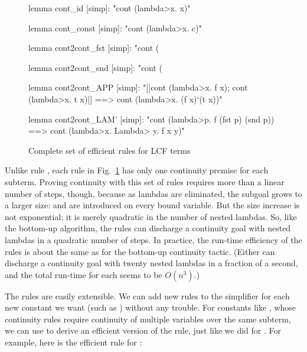 \begin{figure}
\begin{isacode}
lemma cont_id [simp]: "cont (\<lambda>x. x)"
\end{isacode}
\unmedskip
\begin{isacode}
lemma cont_const [simp]: "cont (\<lambda>x. c)"
\end{isacode}
\unmedskip
\begin{isacode}
lemma cont2cont_fst [simp]: "cont (%
\end{isacode}
\unmedskip
\begin{isacode}
lemma cont2cont_snd [simp]: "cont (%
\end{isacode}
\unmedskip
\begin{isacode}
lemma cont2cont_APP [simp]:
  "[|cont (\<lambda>x. f x); cont (\<lambda>x. t x)|] ==> cont (\<lambda>x. (f x)`(t x))"
\end{isacode}
\unmedskip
\begin{isacode}
lemma cont2cont_LAM' [simp]:
  "cont (\<lambda>p. f (fst p) (snd p)) ==> cont (\<lambda>x. \<Lambda> y. f x y)"
\end{isacode}
\caption{Complete set of efficient  rules for LCF terms}
\label{fig:holcf-cont2cont-rules}
\end{figure}

Unlike rule , each rule in Fig.~\ref{fig:holcf-cont2cont-rules} has only one continuity premise for each subterm. Proving continuity with this set of rules requires more than a linear number of steps, though, because as lambdas are eliminated, the subgoal grows to a larger size:  and  are introduced on every bound variable. But the size increase is not exponential; it is merely quadratic in the number of nested lambdas. So, like the bottom-up algorithm, the  rules can discharge a continuity goal with nested lambdas in a quadratic number of steps. In practice, the run-time efficiency of the  rules is about the same as for the bottom-up continuity tactic. (Either can discharge a continuity goal with twenty nested lambdas in a fraction of a second, and the total run-time for each seems to be $O(n^3)$.)

The  rules are easily extensible. We can add new rules to the simplifier for each new constant we want (such as ) without any trouble. For constants like , whose continuity rules require continuity of multiple variables over the same subterm, we can use  to derive an efficient version of the rule, just like we did for . For example, here is the efficient  rule for :

